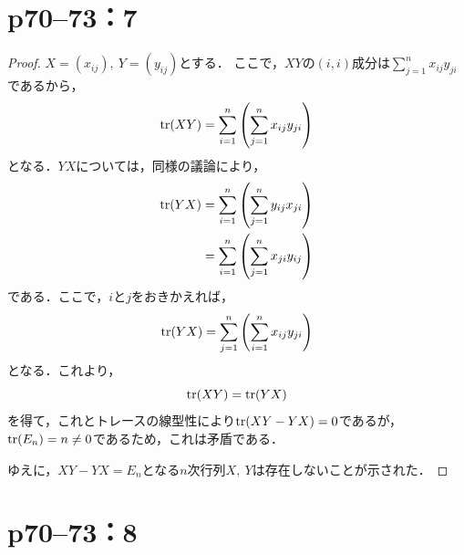 \documentclass[a4paper,10pt,fleqn]{ltjsarticle}
\begin{document}
\newpage

\section*{p70--73：7}

\begin{tleftbar}
  \begin{proof}
    $X=(x_{ij}),~Y=(y_{ij})$とする．
    ここで，$XY$の$(i,i)$成分は$\sum_{j=1}^{n} x_{ij} y_{ji}$であるから，
    \begin{equation*}
      \tr (XY)  =  \sum_{i=1}^{n} \left( \sum_{j=1}^{n} x_{ij} y_{ji} \right)
    \end{equation*}
    となる．$YX$については，同様の議論により，
    \begin{align*}
      \tr  (YX) & =  \sum_{i=1}^{n}\left( \sum_{j=1}^{n}  y_{ij} x_{ji} \right)  \\
                & =  \sum_{i=1}^{n} \left( \sum_{j=1}^{n}  x_{ji} y_{ij} \right)
    \end{align*}
    である．ここで，$i$と$j$をおきかえれば，
    \begin{equation}
      \tr  (YX) = \sum_{j=1}^{n} \left( \sum_{i=1}^{n}  x_{ij} y_{ji} \right)
    \end{equation}
    となる．これより，
    \begin{equation}
      \tr (XY) = \tr  (YX)
    \end{equation}
    を得て，これとトレースの線型性により$\tr (XY-YX) =0$であるが，$\tr  (E_n) =n \neq 0$であるため，これは矛盾である．

    ゆえに，$XY-YX=E_n$となる$n$次行列$X,~Y$は存在しないことが示された．
  \end{proof}
\end{tleftbar}

\newpage

\section*{p70--73：8}
\end{document}
